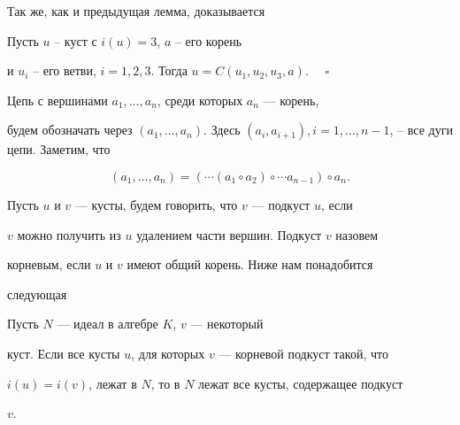 Так же, как и предыдущая лемма, доказывается





\begin{lem} Пусть $u$ -- куст с $i(u)=3$, $a$ -- его корень


и $u_i$ -- его ветви, $i=1,2,3$. Тогда $u=C(u_1,u_2,u_3,a)$. $\quad\square$


\end{lem}





Цепь с вершинами $a_1,\dotsc,a_n$, среди которых $a_n$ --- корень,


будем обозначать через $(a_1,\dotsc ,a_n)$. Здесь $(a_i,a_{i+1}), i=1,


\dotsc ,n-1$, -- все дуги цепи. Заметим, что


\begin{equation}\label{12}


(a_1,\dotsc ,a_n) = (\dotsb (a_1 \circ a_2) \circ \dotsb a_{n-1})


\circ a_n.


\end{equation}





Пусть $u$ и $v$ --- кусты, будем говорить, что $v$ --- подкуст $u$, если


$v$ можно получить из $u$ удалением части вершин. Подкуст $v$ назовем


корневым, если $u$ и $v$ имеют общий корень. Ниже нам понадобится


следующая





\begin{lem} Пусть $N$ --- идеал в алгебре $K$, $v$ --- некоторый


куст. Если все кусты $u$, для которых $v$ --- корневой подкуст такой, что


$i(u)=i(v)$, лежат в $N$, то в $N$ лежат все кусты, содержащее подкуст


$v$.


\end{lem}





